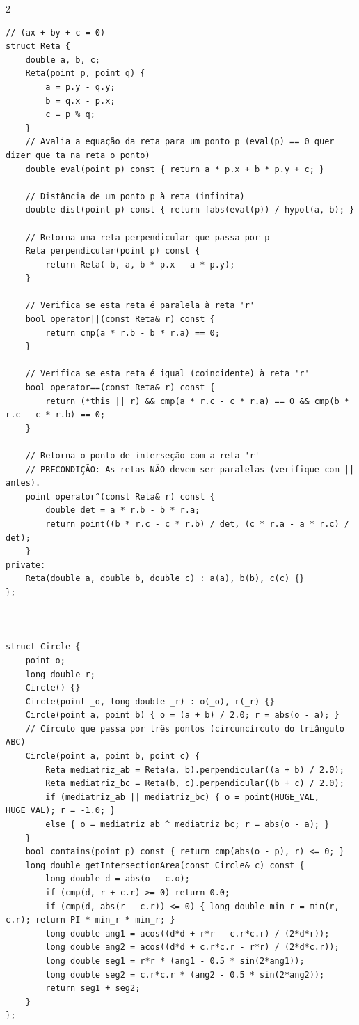 \documentclass[11pt]{article}
\begin{document}
\begin{multicols}{2}
\begin{lstlisting}
// (ax + by + c = 0)
struct Reta {
    double a, b, c;
    Reta(point p, point q) {
        a = p.y - q.y;
        b = q.x - p.x;
        c = p % q;
    }
    // Avalia a equação da reta para um ponto p (eval(p) == 0 quer dizer que ta na reta o ponto)
    double eval(point p) const { return a * p.x + b * p.y + c; }

    // Distância de um ponto p à reta (infinita)
    double dist(point p) const { return fabs(eval(p)) / hypot(a, b); }

    // Retorna uma reta perpendicular que passa por p
    Reta perpendicular(point p) const {
        return Reta(-b, a, b * p.x - a * p.y);
    }

    // Verifica se esta reta é paralela à reta 'r'
    bool operator||(const Reta& r) const {
        return cmp(a * r.b - b * r.a) == 0;
    }

    // Verifica se esta reta é igual (coincidente) à reta 'r'
    bool operator==(const Reta& r) const {
        return (*this || r) && cmp(a * r.c - c * r.a) == 0 && cmp(b * r.c - c * r.b) == 0;
    }

    // Retorna o ponto de interseção com a reta 'r'
    // PRECONDIÇÃO: As retas NÃO devem ser paralelas (verifique com || antes).
    point operator^(const Reta& r) const {
        double det = a * r.b - b * r.a;
        return point((b * r.c - c * r.b) / det, (c * r.a - a * r.c) / det);
    }
private:
    Reta(double a, double b, double c) : a(a), b(b), c(c) {}
};



struct Circle {
    point o;
    long double r;
    Circle() {}
    Circle(point _o, long double _r) : o(_o), r(_r) {}
    Circle(point a, point b) { o = (a + b) / 2.0; r = abs(o - a); }
    // Círculo que passa por três pontos (circuncírculo do triângulo ABC)
    Circle(point a, point b, point c) {
        Reta mediatriz_ab = Reta(a, b).perpendicular((a + b) / 2.0);
        Reta mediatriz_bc = Reta(b, c).perpendicular((b + c) / 2.0);
        if (mediatriz_ab || mediatriz_bc) { o = point(HUGE_VAL, HUGE_VAL); r = -1.0; }
        else { o = mediatriz_ab ^ mediatriz_bc; r = abs(o - a); }
    }
    bool contains(point p) const { return cmp(abs(o - p), r) <= 0; }
    long double getIntersectionArea(const Circle& c) const {
        long double d = abs(o - c.o);
        if (cmp(d, r + c.r) >= 0) return 0.0;
        if (cmp(d, abs(r - c.r)) <= 0) { long double min_r = min(r, c.r); return PI * min_r * min_r; }
        long double ang1 = acos((d*d + r*r - c.r*c.r) / (2*d*r));
        long double ang2 = acos((d*d + c.r*c.r - r*r) / (2*d*c.r));
        long double seg1 = r*r * (ang1 - 0.5 * sin(2*ang1));
        long double seg2 = c.r*c.r * (ang2 - 0.5 * sin(2*ang2));
        return seg1 + seg2;
    }
};



\end{lstlisting}
\end{multicols}
\end{document}

